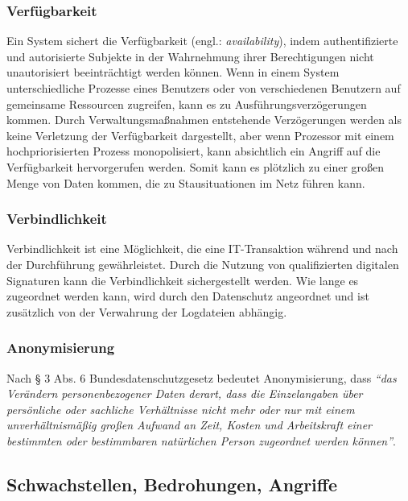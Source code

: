 \subsubsection{Verfügbarkeit}

Ein System sichert die Verfügbarkeit (engl.: \textit{availability}), indem authentifizierte und autorisierte Subjekte in der Wahrnehmung ihrer Berechtigungen nicht unautorisiert beeinträchtigt werden können. Wenn in einem System unterschiedliche Prozesse eines Benutzers oder von verschiedenen Benutzern auf gemeinsame Ressourcen zugreifen, kann es zu Ausführungsverzögerungen kommen. Durch Verwaltungsmaßnahmen entstehende Verzögerungen werden als keine Verletzung der Verfügbarkeit dargestellt, aber wenn Prozessor mit einem hochpriorisierten Prozess monopolisiert, kann absichtlich ein Angriff auf die Verfügbarkeit hervorgerufen werden. Somit kann es plötzlich zu einer großen Menge von Daten kommen, die zu Stausituationen im Netz führen kann\cite[33]{eckert2013sicherheit}.

\subsubsection{Verbindlichkeit}

Verbindlichkeit ist eine Möglichkeit, die eine IT-Transaktion während und nach der Durchführung gewährleistet. Durch die Nutzung von qualifizierten digitalen Signaturen kann die Verbindlichkeit sichergestellt werden. Wie lange es zugeordnet werden kann, wird durch den Datenschutz angeordnet und ist zusätzlich von der Verwahrung der Logdateien abhängig\cite{secupedia11}.

\subsubsection{Anonymisierung}

Nach § 3 Abs. 6 Bundesdatenschutzgesetz bedeutet Anonymisierung, dass \emph{"`das Verändern personenbezogener Daten derart, dass die Einzelangaben über persönliche oder sachliche Verhältnisse nicht mehr oder nur mit einem unverhältnismäßig großen Aufwand an Zeit, Kosten und Arbeitskraft einer bestimmten oder bestimmbaren natürlichen Person zugeordnet werden können"'}\cite{dsba2018}. 

\subsection{Schwachstellen, Bedrohungen, Angriffe}

